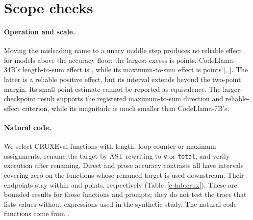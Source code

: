 \section{Scope checks}
\label{c-app:boundaries}

\paragraph{Operation and scale.} Moving the misleading name to a unary middle step produces
no reliable effect for models above the accuracy floor; the largest excess is
 points. CodeLlama-34B's length-to-sum effect is ,
while its maximum-to-sum effect is  points
[, ]. The latter is a reliable positive effect, but its
interval extends beyond the two-point margin. Its small point estimate cannot be reported as
equivalence. The larger-checkpoint result supports the registered maximum-to-sum direction
and reliable-effect criterion, while its magnitude is much smaller than CodeLlama-7B's.

\paragraph{Natural code.} We select  CRUXEval functions with length, loop-counter
or maximum assignments, rename the target by AST rewriting to \texttt{v} or \texttt{total},
and verify execution after renaming. Direct and prose accuracy contrasts all have intervals
covering zero on the  functions whose renamed target is used downstream.
Their endpoints stay within  and
 points, respectively (Table~\ref{c-tab:crux}). These are bounded results
for those functions and prompts; they do not test the trace that lists values without expressions used in the synthetic
study.
The natural-code functions come from \citet{gu2024cruxeval}.


\begin{table}[t]
\centering\small

\caption{ CRUXEval functions that assign a variable from \texttt{len(\ldots)}
(), a loop counter () or \texttt{max(\ldots)}
(), of which  use it downstream; each rendered with the
original name, the neutral name \texttt{v}, and the misleading name \texttt{total}. Accuracy
on all neutral renderings, and the paired misleading-minus-neutral difference in points on
the downstream-used subset, with a bootstrap interval over functions.}
\label{c-tab:crux}
\end{table}


